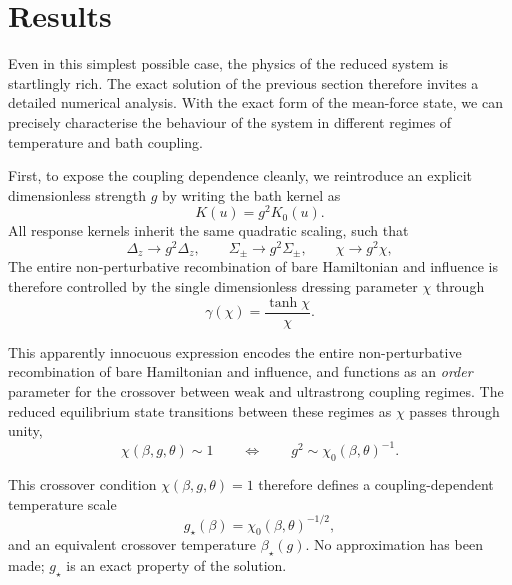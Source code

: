 \section{Results}
\label{sec:physical_regimes}

Even in this simplest possible case, the physics of the reduced system is startlingly rich. The exact solution of the previous section therefore invites a detailed numerical analysis. With the exact form of the mean-force state, we can precisely characterise the behaviour of the system in different regimes of temperature and bath coupling. 

First, to expose the coupling dependence cleanly, we reintroduce an explicit dimensionless strength $g$ by writing the bath kernel as
\begin{equation}
    K(u)=g^2 K_0(u).
\end{equation}
All response kernels inherit the same quadratic scaling, such that
\begin{equation}
    \Delta_z \to g^2 \Delta_{z},
    \qquad
    \Sigma_\pm \to g^2 \Sigma_{\pm},
    \qquad
    \chi \to g^2 \chi,
\end{equation}
The entire non-perturbative recombination of bare Hamiltonian and influence is therefore controlled by the single dimensionless dressing parameter $\chi$ through
\begin{equation}
    \gamma(\chi)=\frac{\tanh\chi}{\chi}.
    \label{eq:gamma_chi_validation}
\end{equation}

This apparently innocuous expression encodes the entire non-perturbative recombination of bare Hamiltonian and influence, and functions as an \emph{order} parameter for the crossover between weak and ultrastrong coupling regimes. The reduced equilibrium state transitions between these regimes as $\chi$ passes through unity,
\begin{equation}
    \chi(\beta,g,\theta)\sim 1
    \qquad \Longleftrightarrow \qquad
    g^2 \sim \chi_0(\beta,\theta)^{-1}.
    \label{eq:chi_crossover_condition_v5}
\end{equation}


This crossover condition $\chi(\beta,g,\theta)=1$ therefore
defines a coupling-dependent temperature scale
\begin{equation}
  g_\star(\beta) = \chi_0(\beta,\theta)^{-1/2},
  \label{eq:gstar_def_v6}
\end{equation}
and an equivalent crossover temperature $\beta_\star(g)$.  No approximation has
been made; $g_\star$ is an exact property of the solution.

